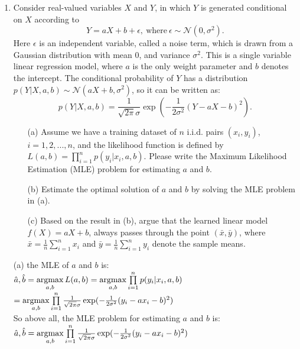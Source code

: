 \documentclass[10pt]{article}
\begin{document}
\begin{enumerate}[1.]
	      \newpage

	\item {} Consider real-valued variables $X$ and $Y$, in which $Y$ is generated conditional on $X$ according to
	$$
	Y = aX + b + \epsilon, \ \text{where} \ \epsilon \sim \mathcal{N}(0, \sigma^2).
	$$
	Here $\epsilon$ is an independent variable, called a noise term, which is drawn from a Gaussian distribution with mean 0,
	and variance $\sigma^2$. This is a single variable linear regression model, where $a$ is the only weight parameter and $b$ denotes the intercept.
	The conditional probability of $Y$ has a distribution $p(Y | X, a, b) \sim \mathcal{N}(aX+b, \sigma^2)$, so it can be written as:
	$$
	p(Y|X, a,b) = \frac{1}{\sqrt{2\pi}\sigma}\exp\left(-\frac{1}{2\sigma^2}(Y - aX -b)^2\right).
	$$
	\begin{itemize}
		\item[(a)] Assume we have a training dataset of $n$ i.i.d. pairs $(x_i, y_i)$, $i = 1, 2, ..., n$, and
		the likelihood function is defined by $L(a,b) = \prod_{i=1}^n p(y_i | x_i, a, b)$. Please write the
		Maximum Likelihood Estimation (MLE) problem for estimating $a$ and $b$.~
		\item[(b)] Estimate the optimal solution of $a$ and $b$ by solving the MLE problem in (a).~
		\item[(c)] Based on the result in (b), argue that the learned linear model $f(X) = aX + b$,
		always passes through the point $(\bar{x},\bar{y})$,
		where $\bar{x} = \tfrac{1}{n}\sum_{i=1}^{n}x_{i}$ and $\bar{y} = \tfrac{1}{n}\sum_{i=1}^{n}y_{i}$ denote the sample means.~
	\end{itemize}


(a) the MLE of $a$ and $b$ is:\\
$\hat{a},\hat{b}=\mathop{\rm argmax}\limits_{a,b}L(a,b)=\mathop{\rm argmax}\limits_{a,b}\prod\limits_{i=1}^np(y_i|x_i,a,b)$
$=\mathop{\rm argmax}\limits_{a,b}\prod\limits_{i=1}^n\frac{1}{\sqrt{2\pi}\sigma}\exp(-\frac{1}{2\sigma^2}(y_i-ax_i-b)^2)$\\

So above all, the MLE problem for estimating $a$ and $b$ is:\\
$\hat{a},\hat{b}=\mathop{\rm argmax}\limits_{a,b}\prod\limits_{i=1}^n\frac{1}{\sqrt{2\pi}\sigma}\exp(-\frac{1}{2\sigma^2}(y_i-ax_i-b)^2)$\\


\end{enumerate}
\end{document}
